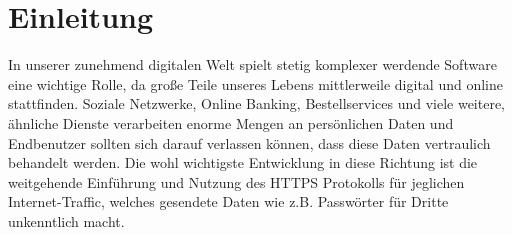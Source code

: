\section{Einleitung} 
In unserer zunehmend digitalen Welt spielt stetig komplexer werdende Software eine wichtige Rolle,
 da große Teile unseres Lebens mittlerweile digital und online stattfinden. Soziale Netzwerke, Online Banking, Bestellservices und viele weitere, ähnliche Dienste verarbeiten enorme Mengen an persönlichen Daten und Endbenutzer sollten sich darauf verlassen können, dass diese Daten vertraulich behandelt werden. Die wohl wichtigste Entwicklung in diese Richtung ist die weitgehende Einführung und Nutzung des HTTPS Protokolls für jeglichen Internet-Traffic, welches gesendete Daten wie z.B. Passwörter für Dritte unkenntlich macht. 
